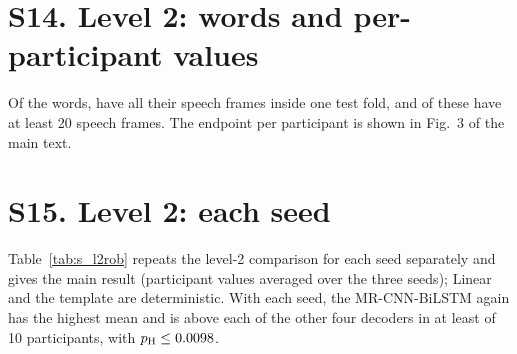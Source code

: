 \documentclass[10pt,a4paper]{article}
\begin{document}
\section*{S14. Level 2: words and per-participant values}

Of the \NXTotalTrials{} words, \NWWordsFold{} have all their speech frames inside one test fold, and \NWWords{} of these have at least 20 speech frames. The endpoint per participant is shown in Fig.~3 of the main text.

\section*{S15. Level 2: each seed}

Table~\ref{tab:s_l2rob} repeats the level-2 comparison for each seed separately and gives the main result (participant values averaged over the three seeds); Linear and the template are deterministic. With each seed, the MR-CNN-BiLSTM again has the highest mean and is above each of the other four decoders in at least \NWSeedMinWin{} of 10 participants, with $p_\mathrm{H}\le0.0098$.

\begin{table}[H]
\caption{Level 2, each seed. $\Delta$, MR-CNN-BiLSTM minus the decoder; $n$, participants in which the MR-CNN-BiLSTM is higher; $p_\mathrm{H}$, Holm over the comparisons of each row.}
\label{tab:s_l2rob}
\centering\scriptsize
\setlength{\tabcolsep}{3pt}
\end{table}
\end{document}
